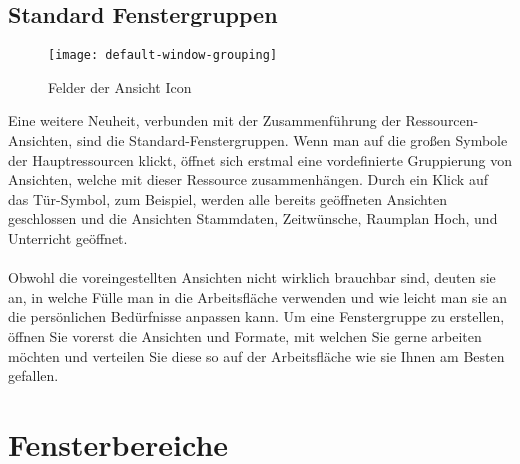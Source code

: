 \newpage

\subsection{Standard Fenstergruppen}

\begin{wrapfigure}{r}{0.4\textwidth}
	\vspace{-14pt}
	\texttt{[image: default-window-grouping]}
	\vspace{-5pt}
	\caption{Felder der Ansicht Icon}
	\label{fig:default-window-grouping}
	\vspace{-10pt}
\end{wrapfigure}

Eine weitere Neuheit, verbunden mit der Zusammenführung der Ressourcen-Ansichten, sind die Standard-Fenstergruppen. Wenn man auf die großen Symbole der Hauptressourcen klickt, öffnet sich erstmal eine vordefinierte Gruppierung von Ansichten, welche mit dieser Ressource zusammenhängen. Durch ein Klick auf das Tür-Symbol, zum Beispiel, werden alle bereits geöffneten Ansichten geschlossen und die Ansichten Stammdaten, Zeitwünsche, Raumplan Hoch, und Unterricht geöffnet.\\
\\
Obwohl die voreingestellten Ansichten nicht wirklich brauchbar sind, deuten sie an, in welche Fülle man in die Arbeitsfläche verwenden und wie leicht man sie an die persönlichen Bedürfnisse anpassen kann. Um eine Fenstergruppe zu erstellen, öffnen Sie vorerst die Ansichten und Formate, mit welchen Sie gerne arbeiten möchten und verteilen Sie diese so auf der Arbeitsfläche wie sie Ihnen am Besten gefallen.\\

\section{Fensterbereiche} %

